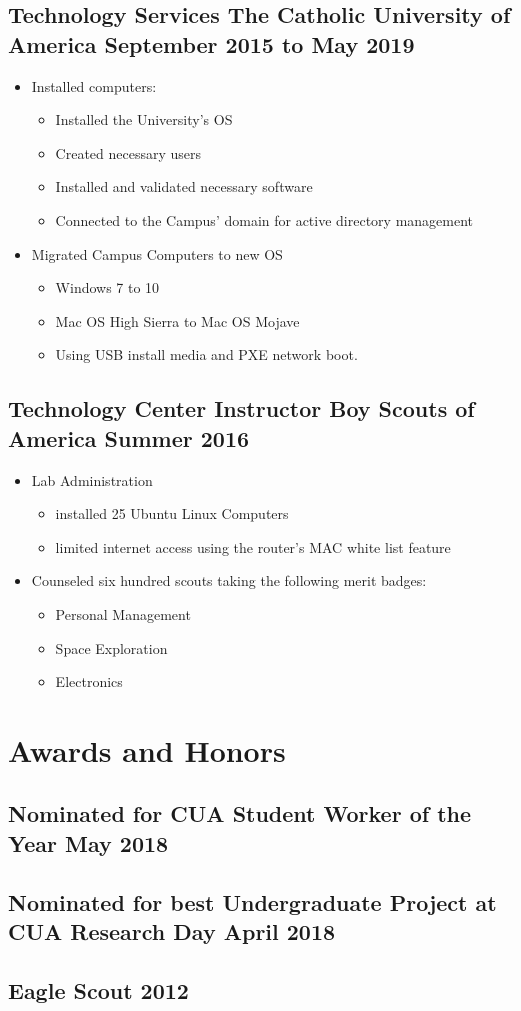 \documentclass[11pt, a4paper]{article}
\begin{document}
\subsection{Technology Services \hspace {20pt}The Catholic University of America \hfill September 2015 to May 2019}
\begin{itemize}
	\item Installed computers:
		\begin{itemize}
			\item Installed the University's OS
			\item Created necessary users
			\item Installed and validated necessary software
			\item Connected to the Campus' domain for active directory management
		\end{itemize}
	\item Migrated Campus Computers to new OS
		\begin{itemize}
			\item Windows 7 to 10
			\item Mac OS High Sierra to Mac OS Mojave
			\item Using USB install media and PXE network boot.
		\end{itemize}
\end{itemize}
\subsection{Technology Center Instructor \hspace {25pt} Boy Scouts of America \hfill Summer 2016}
\begin{itemize}
	\item Lab Administration
		\begin{itemize}
			\item installed 25 Ubuntu Linux Computers
			\item limited internet access using the router's MAC white list feature
		\end{itemize}
	\item Counseled six hundred scouts taking the following merit badges:
	\begin{itemize}
		\item Personal Management
		\item Space Exploration
		\item Electronics
	\end{itemize}
\end{itemize}

\section{Awards and Honors}
\subsection{Nominated for CUA Student Worker of the Year \hfill May 2018}
\subsection{Nominated for best Undergraduate Project at CUA Research Day \hfill April 2018}
\subsection{Eagle Scout \hfill 2012}
\end{document}
